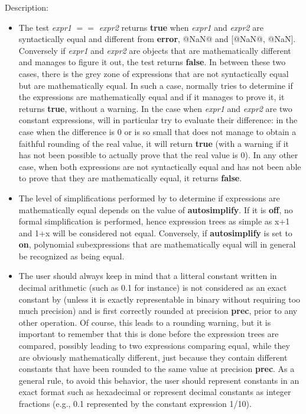 \noindent Description: \begin{itemize}

\item The test \emph{expr1} \textbf{$==$} \emph{expr2} returns \textbf{true} when \emph{expr1} and \emph{expr2} are
   syntactically equal and different from \textbf{error}, @NaN@ and [@NaN@, @NaN].
   Conversely if \emph{expr1} and \emph{expr2} are objects that are mathematically
   different and \sollya manages to figure it out, the test returns \textbf{false}.
   In between these two cases, there is the grey zone of expressions that are
   not syntactically equal but are mathematically equal. In such a case,
   \sollya normally tries to determine if the expressions are mathematically
   equal and if it manages to prove it, it returns \textbf{true}, without a warning. In
   the case when \emph{expr1} and \emph{expr2} are two constant expressions, \sollya will
   in particular try to evaluate their difference: in the case when the
   difference is 0 or is so small that \sollya does not manage to obtain a
   faithful rounding of the real value, it will return \textbf{true} (with a warning if
   it has not been possible to actually prove that the real value is 0). In any
   other case, when both expressions are not syntactically equal and \sollya
   has not been able to prove that they are mathematically equal, it
   returns \textbf{false}.

\item The level of simplifications performed by \sollya to determine if
   expressions are mathematically equal depends on the value of \textbf{autosimplify}.
   If it is \textbf{off}, no formal simplification is performed, hence expression trees
   as simple as x+1 and 1+x will be considered not equal. Conversely, if
   \textbf{autosimplify} is set to \textbf{on}, polynomial subexpressions that are
   mathematically equal will in general be recognized as being equal.

\item The user should always keep in mind that a litteral constant written in
   decimal arithmetic (such as 0.1 for instance) is not considered as an exact
   constant by \sollya (unless it is exactly representable in binary without
   requiring too much precision) and is first correctly rounded at precision
   \textbf{prec}, prior to any other operation. Of course, this leads to a rounding
   warning, but it is important to remember that this is done before the
   expression trees are compared, possibly leading to two expressions comparing
   equal, while they are obviously mathematically different, just because they
   contain different constants that have been rounded to the same value at
   precision \textbf{prec}. As a general rule, to avoid this behavior, the user should
   represent constants in an exact format such as hexadecimal or represent
   decimal constants as integer fractions (e.g., 0.1 represented by the constant
   expression 1/10).


\end{itemize}
